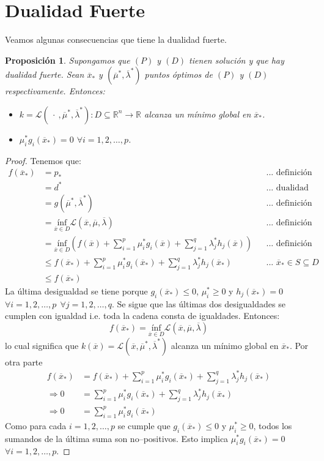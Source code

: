 \documentclass[11pt]{report}
\newtheorem{proposition}{Proposición}[section]
\newcommand{\Rn}{\mathbb{R}^{n}}
\newcommand{\R}{\mathbb{R}}
\newcommand{\mv}{\overline{\mu}}
\newcommand{\lv}{\overline{\lambda}}
\newcommand{\x}{\overline{x}}
\newcommand{\Sp}{1,2,\ldots, p}
\newcommand{\Sq}{1,2,\ldots, q}
\newcommand{\La}{\mathcal{L}}
\newcommand{\po}{p_{*}}
\newcommand{\xo}{\overline{x}_{*}}
\newcommand{\deo}{d^{*}}
\newcommand{\muo}{\overline{\mu}^{*}}
\newcommand{\lao}{\overline{\lambda}^{*}}
\newcommand{\mlo}{(\overline{\mu}^{*},\overline{\lambda}^{*})}
\begin{document}
\section{Dualidad Fuerte}
\noindent
Veamos algunas consecuencias que tiene la dualidad fuerte.


\begin{proposition}
Supongamos que $(P)$ y $(D)$ tienen solución y que hay dualidad fuerte. Sean $\xo$ y $\mlo$ puntos óptimos de $(P)$ y $(D)$ respectivamente. Entonces:
\begin{itemize}
\item[(i)] $k=\La(\ \cdot\ ,\muo, \lao):D\subseteq\Rn\rightarrow\R$ alcanza un mínimo global en $\xo$.
\item[(ii)] $\mu_{i}^{*}g_{i}(\xo)=0$ $\forall i=\Sp$.
\end{itemize}
\end{proposition}
\begin{proof}
Tenemos que:
\begin{equation*}
\begin{aligned}
f(\xo)&=\po &&\text{... definición}\\
&=\deo &&\text{... dualidad fuerte}\\
&=g(\muo,\lao) &&\text{... definición}\\
&=\underset{\x\in D}{\text{ínf}}\La(\x,\mv,\lv) &&\text{... definición}\\
&=\underset{\x\in D}{\text{ínf}} \left( f(\x)+\sum_{i=1}^{p}\mu_{i}^{*} g_{i}(\x) + \sum_{j=1}^{q}\lambda_{j}^{*} h_{j}(\x) \right) &&\text{... definición}\\
&\leq f(\xo)+\sum_{i=1}^{p}\mu_{i}^{*} g_{i}(\xo) + \sum_{j=1}^{q}\lambda_{j}^{*} h_{j}(\xo) &&\text{... $\xo\in S\subseteq D$}\\
&\leq f(\xo)
\end{aligned}
\end{equation*}
La última desigualdad se tiene porque $g_{i}(\xo)\leq0$, $\mu_{i}^{*}\geq0$ y $h_{j}(\xo)=0$ $\forall i=\Sp\ \ \forall j=\Sq$. Se sigue que las últimas dos desigualdades se cumplen con igualdad i.e. toda la cadena consta de igualdades. Entonces:
$$f(\xo)=\underset{\x\in D}{\text{ínf}}\La(\x,\mv,\lv)$$
lo cual significa que $k(\x)=\La(\x,\muo, \lao)$ alcanza un mínimo global en $\xo$.
Por otra parte
\begin{equation*}
\begin{aligned}
f(\xo)&=f(\xo)+\sum_{i=1}^{p}\mu_{i}^{*} g_{i}(\xo) + \sum_{j=1}^{q}\lambda_{j}^{*} h_{j}(\xo)\\
\Rightarrow 0&=\sum_{i=1}^{p}\mu_{i}^{*} g_{i}(\xo) + \sum_{j=1}^{q}\lambda_{j}^{*} h_{j}(\xo)\\
\Rightarrow 0&=\sum_{i=1}^{p}\mu_{i}^{*} g_{i}(\xo)
\end{aligned}
\end{equation*}
Como para cada $i=\Sp$ se cumple que $g_{i}(\xo)\leq0$ y $\mu_{i}^{*}\geq0$, todos los sumandos de la última suma son no--positivos. Esto implica $\mu_{i}^{*}g_{i}(\xo)=0$ $\forall i=\Sp$.
\end{proof}
\end{document}
